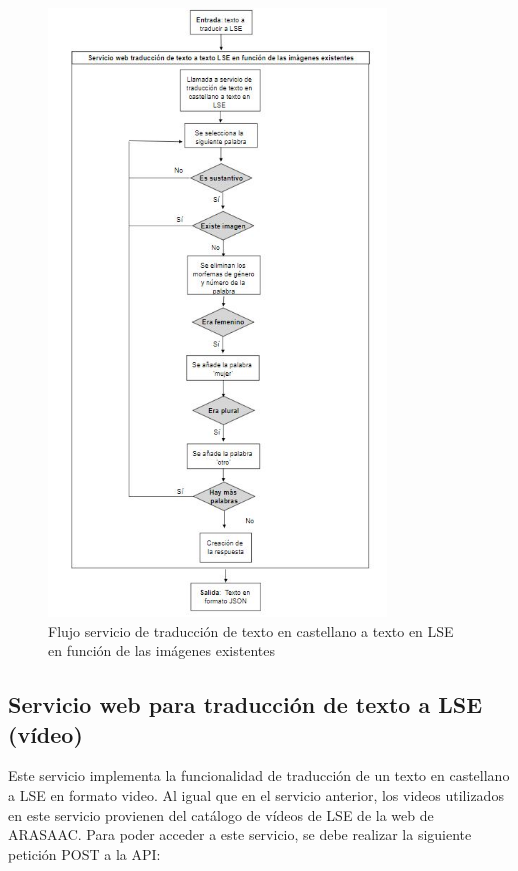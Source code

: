 \begin{figure}[]
	\centering
	\includegraphics[width=0.8\textwidth]{Imagenes/Fuentes/Text2LSE/FlujoTextoImagenTexto.jpg}
	\caption{ Flujo servicio de traducción de texto en castellano a texto en LSE en función de las imágenes existentes }
	\label {fig: imgFlujoTextoImagenTextoText2LSE}
\end{figure}


\subsection{Servicio web para traducción de texto a LSE (vídeo)}

Este servicio implementa la funcionalidad de traducción de un texto en castellano a LSE en formato video. Al igual que en el servicio anterior, los videos utilizados en este servicio provienen del catálogo de vídeos de LSE de la web de ARASAAC. Para poder acceder a este servicio, se debe realizar la siguiente petición POST a la API:\\

